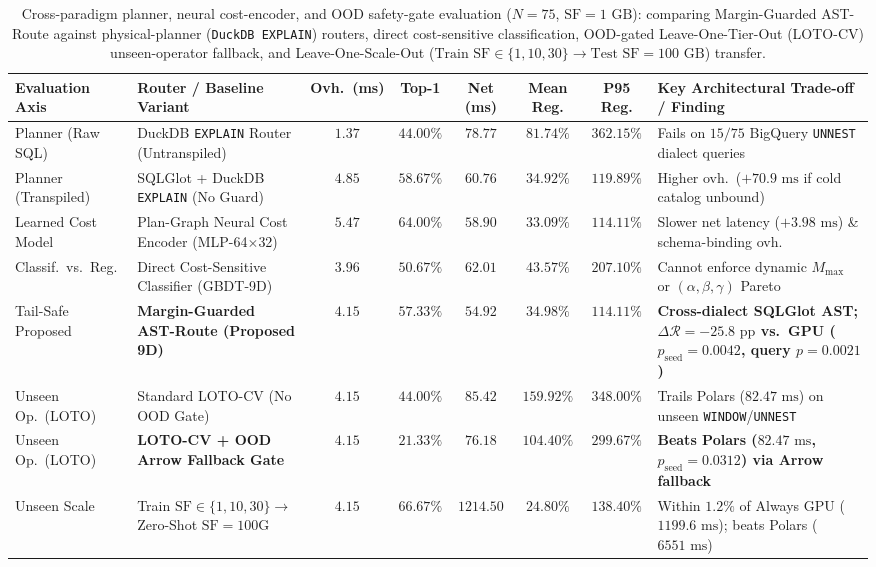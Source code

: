 \documentclass[10pt,a4paper]{article}
\newenvironment{fitasttable}{%
  \begin{lrbox}{\asttblbox}%
}{%
  \end{lrbox}%
  \sbox{\asttblboxB}{%
    \ifdim\wd\asttblbox>0.96\textwidth
      \resizebox{0.96\textwidth}{!}{\usebox{\asttblbox}}%
    \else
      \usebox{\asttblbox}%
    \fi
  }%
  \ifdim\ht\asttblboxB>0.78\textheight
    \resizebox{!}{0.78\textheight}{\usebox{\asttblboxB}}%
  \else
    \usebox{\asttblboxB}%
  \fi
}
\begin{document}
\begin{table}[!htbp]
\centering
\caption{Cross-paradigm planner, neural cost-encoder, and OOD safety-gate evaluation ($N=75$, $\text{SF}=1\text{ GB}$): comparing Margin-Guarded AST-Route against physical-planner (\texttt{DuckDB EXPLAIN}) routers, direct cost-sensitive classification, OOD-gated Leave-One-Tier-Out (LOTO-CV) unseen-operator fallback, and Leave-One-Scale-Out ($\text{Train SF}\in\{1,10,30\}\rightarrow\text{Test SF}=100\text{ GB}$) transfer.}\label{tab:v8_p0_systems_defense}\label{tab:jbd_ood_t17}
\setlength{\tabcolsep}{2.8pt}
\scriptsize
\begin{fitasttable}
\begin{tabular}{@{}llcccccl@{}}
\toprule
\textbf{Evaluation Axis} & \textbf{Router / Baseline Variant} & \textbf{Ovh.\ (ms)} & \textbf{Top-1} & \textbf{Net (ms)} & \textbf{Mean Reg.} & \textbf{P95 Reg.} & \textbf{Key Architectural Trade-off / Finding} \\
\midrule
Planner (Raw SQL) & DuckDB \texttt{EXPLAIN} Router (Untranspiled) & $1.37$ & $44.00\%$ & $78.77$ & $81.74\%$ & $362.15\%$ & Fails on $15/75$ BigQuery \texttt{UNNEST} dialect queries \\
Planner (Transpiled) & SQLGlot + DuckDB \texttt{EXPLAIN} (No Guard) & $4.85$ & $58.67\%$ & $60.76$ & $34.92\%$ & $119.89\%$ & Higher ovh.\ ($+70.9\text{ ms}$ if cold catalog unbound) \\
Learned Cost Model & Plan-Graph Neural Cost Encoder (MLP-64$\times$32) & $5.47$ & $64.00\%$ & $58.90$ & $33.09\%$ & $114.11\%$ & Slower net latency ($+3.98\text{ ms}$) \& schema-binding ovh. \\
Classif.\ vs.\ Reg. & Direct Cost-Sensitive Classifier (GBDT-9D) & $3.96$ & $50.67\%$ & $62.01$ & $43.57\%$ & $207.10\%$ & Cannot enforce dynamic $M_{\text{max}}$ or $(\alpha,\beta,\gamma)$ Pareto \\
Tail-Safe Proposed & \textbf{Margin-Guarded AST-Route (Proposed 9D)} & $\mathbf{4.15}$ & $\mathbf{57.33\%}$ & $\mathbf{54.92}$ & $\mathbf{34.98\%}$ & $\mathbf{114.11\%}$ & \textbf{Cross-dialect SQLGlot AST; $\Delta\mathcal{R} = -25.8\text{ pp}$ vs.\ GPU ($p_{\text{seed}}=0.0042$, query $p=0.0021$)} \\
\midrule
Unseen Op.\ (LOTO) & Standard LOTO-CV (No OOD Gate) & $4.15$ & $44.00\%$ & $85.42$ & $159.92\%$ & $348.00\%$ & Trails Polars ($82.47\text{ ms}$) on unseen \texttt{WINDOW}/\texttt{UNNEST} \\
Unseen Op.\ (LOTO) & \textbf{LOTO-CV + OOD Arrow Fallback Gate} & $\mathbf{4.15}$ & $\mathbf{21.33\%}$ & $\mathbf{76.18}$ & $\mathbf{104.40\%}$ & $\mathbf{299.67\%}$ & \textbf{Beats Polars ($82.47\text{ ms}$, $p_{\text{seed}}=0.0312$) via Arrow fallback} \\
Unseen Scale & Train $\text{SF}\in\{1,10,30\}\rightarrow$ Zero-Shot $\text{SF}=100\text{G}$ & $4.15$ & $66.67\%$ & $1214.50$ & $24.80\%$ & $138.40\%$ & Within $1.2\%$ of Always GPU ($1199.6\text{ ms}$); beats Polars ($6551\text{ ms}$) \\
\bottomrule
\end{tabular}
\end{fitasttable}%
\end{table}
\end{document}
